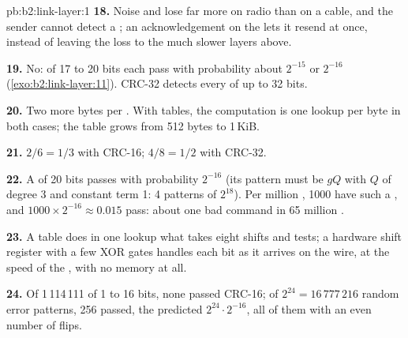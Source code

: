\begin{solution}{pb:b2:link-layer:1}
\textbf{18.} Noise and  lose far more  on radio than on a cable, and the sender cannot detect a
; an acknowledgement on the  lets it resend at once, instead of leaving the loss to the much slower
layers above.

\textbf{19.} No:  of 17 to 20 bits each pass with probability about $2^{-15}$ or $2^{-16}$
(\cref{exo:b2:link-layer:11}). CRC-32 detects every  of up to 32 bits.

\textbf{20.} Two more bytes per . With tables, the computation is one lookup per byte in both cases; the table
grows from 512 bytes to 1\,KiB.

\textbf{21.} $2/6 = 1/3$ with CRC-16; $4/8 = 1/2$ with CRC-32.

\textbf{22.} A  of 20 bits passes with probability $2^{-16}$ (its pattern must be $gQ$ with $Q$ of degree 3 and
constant term 1: 4 patterns of $2^{18}$). Per million , 1000 have such a , and $1000 \times 2^{-16}
\approx 0.015$ pass: about one bad command in 65 million .

\textbf{23.} A table does in one lookup what takes eight shifts and tests; a hardware shift register with a few XOR
gates handles each bit as it arrives on the wire, at the speed of the , with no memory at all.

\textbf{24.} Of 1\,114\,111  of 1 to 16 bits, none passed CRC-16; of $2^{24} = 16\,777\,216$ random error
patterns, 256 passed, the predicted $2^{24} \cdot 2^{-16}$, all of them with an even number of flips.
\end{solution}
